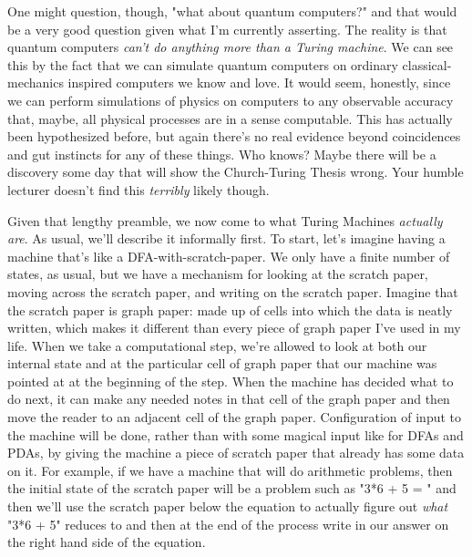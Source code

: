 \documentclass[11pt]{article}
\begin{document}
One might question, though, "what about quantum computers?" and that would be a very good question given what I'm currently asserting. The reality is that quantum computers \emph{can't do anything more than a Turing machine}. We can see this by the fact that we can simulate quantum computers on ordinary classical-mechanics inspired computers we know and love. It would seem, honestly, since we can perform simulations of physics on computers to any observable accuracy that, maybe, all physical processes are in a sense computable. This has actually been hypothesized before, but again there's no real evidence beyond coincidences and gut instincts for any of these things. Who knows? Maybe there will be a discovery some day that will show the Church-Turing Thesis wrong. Your humble lecturer doesn't find this \emph{terribly} likely though. 

Given that lengthy preamble, we now come to what Turing Machines \emph{actually are}. As usual, we'll describe it informally first. To start, let's imagine having a machine that's like a DFA-with-scratch-paper. We only have a finite number of states, as usual, but we have a mechanism for looking at the scratch paper, moving across the scratch paper, and writing on the scratch paper. Imagine that the scratch paper is graph paper: made up of cells into which the data is neatly written, which makes it different than every piece of graph paper I've used in my life. When we take a computational step, we're allowed to look at both our internal state and at the particular cell of graph paper that our machine was pointed at at the beginning of the step. When the machine has decided what to do next, it can make any needed notes in that cell of the graph paper and then move the reader to an adjacent cell of the graph paper. Configuration of input to the machine will be done, rather than with some magical input like for DFAs and PDAs, by giving the machine a piece of scratch paper that already has some data on it. For example, if we have a machine that will do arithmetic problems, then the initial state of the scratch paper will be a problem such as "3*6 + 5 = " and then we'll use the scratch paper below the equation to actually figure out \emph{what} "3*6 + 5" reduces to and then at the end of the process write in our answer on the right hand side of the equation.
\end{document}
